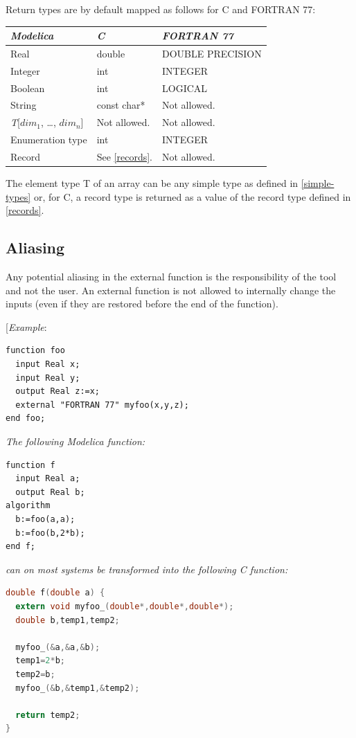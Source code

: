 \documentclass[10pt,a4paper]{report}
\def\doublelabel#1{\label{#1}}
\begin{document}
Return types are by default mapped as follows for C and FORTRAN 77:

\begin{longtable}[]{|l|l|l|}
\hline
\emph{Modelica} & \emph{C} & \emph{FORTRAN 77}\\ \hline
\endhead
Real & double & DOUBLE PRECISION\\ \hline
Integer & int & INTEGER\\ \hline
Boolean & int & LOGICAL\\ \hline
String & const char* & Not allowed.\\ \hline
\emph{T}{[}$\textit{dim}_1$, \ldots{},
$\textit{dim}_{n}${]} & Not allowed. & Not
allowed.\\ \hline
Enumeration type & int & INTEGER\\ \hline
Record & See \ref{records}. & Not allowed.\\ \hline
\end{longtable}

The element type T of an array can be any simple type as defined in
\ref{simple-types} or, for C, a record type is returned as a value of the
record type defined in \ref{records}.

\subsection{Aliasing}\doublelabel{aliasing}

Any potential aliasing in the external function is the responsibility of
the tool and not the user. An external function is not allowed to
internally change the inputs (even if they are restored before the end
of the function).

{[}\emph{Example}:

\begin{lstlisting}[language=modelica]
function foo
  input Real x;
  input Real y;
  output Real z:=x;
  external "FORTRAN 77" myfoo(x,y,z);
end foo;
\end{lstlisting}
\emph{The following Modelica function:}

\begin{lstlisting}[language=modelica]
function f
  input Real a;
  output Real b;
algorithm
  b:=foo(a,a);
  b:=foo(b,2*b);
end f;
\end{lstlisting}
\emph{can on most systems be transformed into the following C function:}
\begin{lstlisting}[language=C]
double f(double a) {
  extern void myfoo_(double*,double*,double*);
  double b,temp1,temp2;

  myfoo_(&a,&a,&b);
  temp1=2*b;
  temp2=b;
  myfoo_(&b,&temp1,&temp2);

  return temp2;
}
\end{lstlisting}
\end{document}
